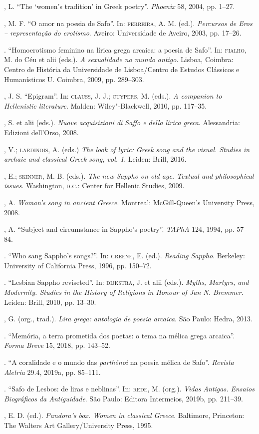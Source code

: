 \begin{bibliohedra}
, L. “The ‘women’s tradition’ in Greek poetry”. \textit{Phoenix} 58, 2004, pp. 1--27.

, M. F. “O amor na poesia de Safo”. In: \textsc{ferreira}, A. M. (ed.). \textit{Percursos de Eros -- representação do erotismo}. Aveiro: Universidade de Aveiro, 2003, pp. 17--26.

\titidem. “Homoerotismo feminino na lírica grega arcaica: a poesia de Safo”. In: \textsc{fialho}, M. do Céu et alii (eds.). \textit{A sexualidade no mundo antigo}. Lisboa, Coimbra: Centro de História da Universidade de Lisboa/Centro de Estudos Clássicos e Humanísticos U. Coimbra, 2009, pp. 289--303. 

, J. S. “Epigram”. In: \textsc{clauss}, J. J.; \textsc{cuypers}, M. (eds.). \textit{A companion to Hellenistic literature}. Malden: Wiley"-Blackwell, 2010, pp. 117--35. 

, S. et alii (eds.). \textit{Nuove acquisizioni di Saffo e della lirica greca}. Alessandria: Edizioni dell'Orso, 2008.

, V.; \textsc{lardinois}, A. (eds.) \textit{The look of lyric: Greek song and the visual. Studies in archaic and classical Greek song, vol. 1}. Leiden: Brill, 2016.

, E.; \textsc{skinner}, M. B. (eds.). \textit{The new Sappho on old age. Textual and philosophical issues}. Washington, \textsc{d.c.}: Center for Hellenic Studies, 2009.

, A. \textit{Woman’s song in ancient Greece}. Montreal: McGill-Queen’s University Press, 2008. 

, A. “Subject and circumstance in Sappho’s poetry”. \textit{TAPhA} 124, 1994, pp. 57--84.

\titidem. “Who sang Sappho’s songs?”. In: \textsc{greene}, E. (ed.). \textit{Reading Sappho}. Berkeley: University of California Press, 1996, pp. 150--72.

\titidem. ``Lesbian Sappho reviseted''. In: \textsc{dijkstra}, J. et alii (eds.). \textit{Myths, Martyrs, and Modernity. Studies in the History of Religions in Honour of Jan N. Bremmer}. Leiden: Brill, 2010, pp. 13--30.

, G. (org., trad.). \textit{Lira grega: antologia de poesia arcaica}. São Paulo: Hedra, 2013.

\titidem. “Memória, a terra prometida dos poetas: o tema na mélica grega arcaica”. \textit{Forma Breve} 15, 2018, pp. 143--52. 

\titidem. “A coralidade e o mundo das \textit{parthénoi} na poesia mélica de Safo”. \textit{Revista Aletria} 29.4, 2019a, pp. 85--111. 

\titidem. “Safo de Lesbos: de liras e neblinas”. In: \textsc{rede}, M. (org.). \textit{Vidas Antigas. Ensaios Biográficos da Antiguidade}. São Paulo: Editora Intermeios, 2019b, pp. 211--39.

, E. D. (ed.). \textit{Pandora’s box. Women in classical Greece}. Baltimore, Princeton: The Walters Art Gallery/University Press, 1995.

\end{bibliohedra}


